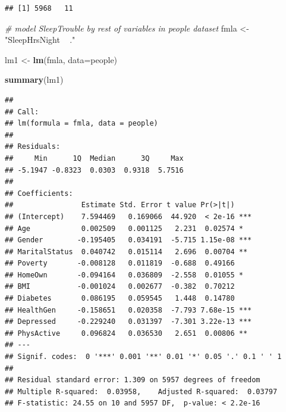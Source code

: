 \documentclass[]{article}
\newenvironment{Shaded}{\begin{snugshade}}{\end{snugshade}}
\newcommand{\KeywordTok}[1]{\textcolor[rgb]{0.13,0.29,0.53}{\textbf{{#1}}}}
\newcommand{\DataTypeTok}[1]{\textcolor[rgb]{0.13,0.29,0.53}{{#1}}}
\newcommand{\DecValTok}[1]{\textcolor[rgb]{0.00,0.00,0.81}{{#1}}}
\newcommand{\StringTok}[1]{\textcolor[rgb]{0.31,0.60,0.02}{{#1}}}
\newcommand{\CommentTok}[1]{\textcolor[rgb]{0.56,0.35,0.01}{\textit{{#1}}}}
\newcommand{\NormalTok}[1]{{#1}}
\begin{document}
\begin{verbatim}
## [1] 5968   11
\end{verbatim}

\begin{Shaded}
\begin{Highlighting}[]
\CommentTok{# model SleepTrouble by rest of variables in people dataset}
\NormalTok{fmla <-}\StringTok{ "SleepHrsNight ~ ."}

\NormalTok{lm1 <-}\StringTok{ }\KeywordTok{lm}\NormalTok{(fmla, }\DataTypeTok{data=}\NormalTok{people)}

\KeywordTok{summary}\NormalTok{(lm1)}
\end{Highlighting}
\end{Shaded}

\begin{verbatim}
## 
## Call:
## lm(formula = fmla, data = people)
## 
## Residuals:
##     Min      1Q  Median      3Q     Max 
## -5.1947 -0.8323  0.0303  0.9318  5.7516 
## 
## Coefficients:
##                Estimate Std. Error t value Pr(>|t|)    
## (Intercept)    7.594469   0.169066  44.920  < 2e-16 ***
## Age            0.002509   0.001125   2.231  0.02574 *  
## Gender        -0.195405   0.034191  -5.715 1.15e-08 ***
## MaritalStatus  0.040742   0.015114   2.696  0.00704 ** 
## Poverty       -0.008128   0.011819  -0.688  0.49166    
## HomeOwn       -0.094164   0.036809  -2.558  0.01055 *  
## BMI           -0.001024   0.002677  -0.382  0.70212    
## Diabetes       0.086195   0.059545   1.448  0.14780    
## HealthGen     -0.158651   0.020358  -7.793 7.68e-15 ***
## Depressed     -0.229240   0.031397  -7.301 3.22e-13 ***
## PhysActive     0.096824   0.036530   2.651  0.00806 ** 
## ---
## Signif. codes:  0 '***' 0.001 '**' 0.01 '*' 0.05 '.' 0.1 ' ' 1
## 
## Residual standard error: 1.309 on 5957 degrees of freedom
## Multiple R-squared:  0.03958,    Adjusted R-squared:  0.03797 
## F-statistic: 24.55 on 10 and 5957 DF,  p-value: < 2.2e-16
\end{verbatim}

\begin{Shaded}
\end{Shaded}
\end{document}

